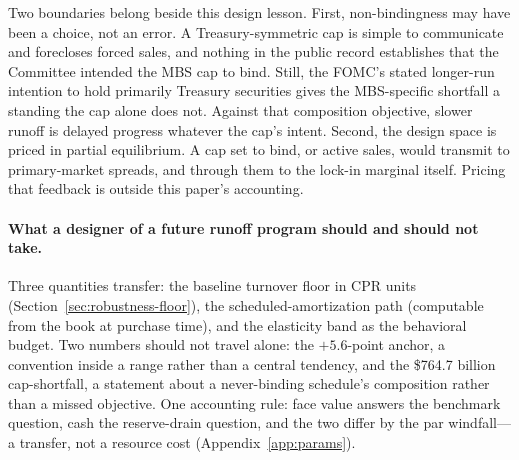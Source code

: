 Two boundaries belong beside this design lesson. First, non-bindingness may have been a choice, not an error. A Treasury-symmetric cap is simple to communicate and forecloses forced sales, and nothing in the public record establishes that the Committee intended the MBS cap to bind. Still, the FOMC's stated longer-run intention to hold primarily Treasury securities gives the MBS-specific shortfall a standing the cap alone does not. Against that composition objective, slower runoff is delayed progress whatever the cap's intent. Second, the design space is priced in partial equilibrium. A cap set to bind, or active sales, would transmit to primary-market spreads, and through them to the lock-in marginal itself. Pricing that feedback is outside this paper's accounting.

\paragraph{What a designer of a future runoff program should and should not take.} Three quantities transfer: the baseline turnover floor in CPR units (Section~\ref{sec:robustness-floor}), the scheduled-amortization path (computable from the book at purchase time), and the elasticity band as the behavioral budget. Two numbers should not travel alone: the $+5.6$-point anchor, a convention inside a range rather than a central tendency, and the \$764.7 billion cap-shortfall, a statement about a never-binding schedule's composition rather than a missed objective. One accounting rule: face value answers the benchmark question, cash the reserve-drain question, and the two differ by the par windfall---a transfer, not a resource cost (Appendix~\ref{app:params}).
